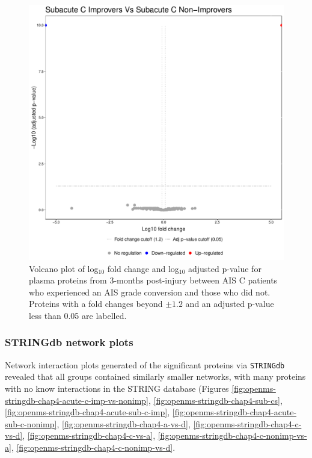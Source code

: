 \documentclass[
]{article}
\begin{document}
\begin{figure}
\includegraphics[width=1\linewidth]{figures/openms_protein_quantification/label_free/openms_volcano_plot_2021-08-10_0026} \caption{Volcano plot of log\(_10\) fold change and log\(_10\) adjusted p-value for plasma proteins from 3-months post-injury between AIS C patients who experienced an AIS grade conversion and those who did not. Proteins with a fold changes beyond \(\pm 1.2\) and an adjusted p-value less than 0.05 are labelled.}\label{fig:volc-plot-subacute-c-imp-vs-nonimp}
\end{figure}

\hypertarget{stringdb-network-plots-1}{%
\subsubsection{STRINGdb network plots}\label{stringdb-network-plots-1}}

Network interaction plots generated of the significant proteins via \texttt{STRINGdb} revealed that all groups contained similarly smaller networks, with many proteins with no know interactions in the STRING database (Figures \ref{fig:openms-stringdb-chap4-acute-c-imp-vs-nonimp}, \ref{fig:openms-stringdb-chap4-sub-cs}, \ref{fig:openms-stringdb-chap4-acute-sub-c-imp}, \ref{fig:openms-stringdb-chap4-acute-sub-c-nonimp}, \ref{fig:openms-stringdb-chap4-a-vs-d}, \ref{fig:openms-stringdb-chap4-c-vs-d}, \ref{fig:openms-stringdb-chap4-c-vs-a}, \ref{fig:openms-stringdb-chap4-c-nonimp-vs-a}, \ref{fig:openms-stringdb-chap4-c-nonimp-vs-d}.
\end{document}
